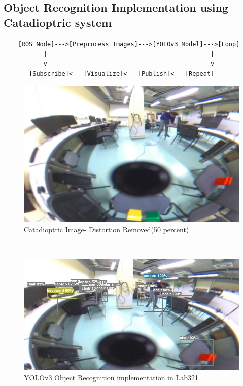 \documentclass[11pt, a4paper, openany]{book}
\begin{document}
\subsection{Object Recognition Implementation using Catadioptric system}
\begin{lstlisting}
    [ROS Node]--->[Preprocess Images]--->[YOLOv3 Model]--->[Loop]
           |                                             |
           v                                             v
       [Subscribe]<---[Visualize]<---[Publish]<---[Repeat]
\end{lstlisting}
 \begin{figure}[H]
    \centering
    \includegraphics[scale=0.5]{Labbot&ele/q.png}
    \caption{Catadioptric Image- Distortion Removed(50 percent)}
    \label{fig:back} 
\end{figure}\

 \begin{figure}[H]
    \centering
    \includegraphics[scale=0.6]{Labbot&ele/m.jpg}
    \caption{YOLOv3 Object Recognition implementation in Lab321}
    \label{fig:back} 
\end{figure}\
\end{document}
